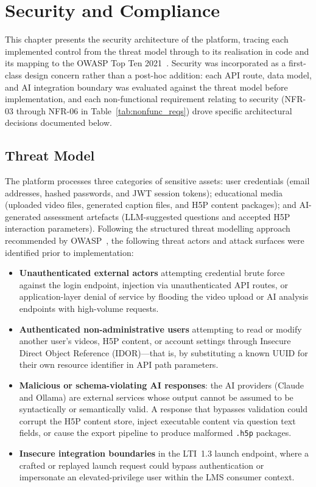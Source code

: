 \chapter{Security and Compliance}

This chapter presents the security architecture of the platform, tracing each
implemented control from the threat model through to its realisation in code
and its mapping to the OWASP Top Ten 2021~\cite{owasp2021}. Security was
incorporated as a first-class design concern rather than a post-hoc addition:
each API route, data model, and AI integration boundary was evaluated against
the threat model before implementation, and each non-functional requirement
relating to security (NFR-03 through NFR-06 in Table~\ref{tab:nonfunc_reqs})
drove specific architectural decisions documented below.

\section{Threat Model}
\label{sec:threat_model}

The platform processes three categories of sensitive assets: user credentials
(email addresses, hashed passwords, and JWT session tokens); educational
media (uploaded video files, generated caption files, and H5P content
packages); and AI-generated assessment artefacts (LLM-suggested questions
and accepted H5P interaction parameters). Following the structured threat
modelling approach recommended by OWASP~\cite{owasp2021}, the following
threat actors and attack surfaces were identified prior to implementation:

\begin{itemize}
  \item \textbf{Unauthenticated external actors} attempting credential brute
  force against the login endpoint, injection via unauthenticated API routes,
  or application-layer denial of service by flooding the video upload or AI
  analysis endpoints with high-volume requests.

  \item \textbf{Authenticated non-administrative users} attempting to read or
  modify another user's videos, H5P content, or account settings through
  Insecure Direct Object Reference (IDOR)---that is, by substituting a known
  UUID for their own resource identifier in API path parameters.

  \item \textbf{Malicious or schema-violating AI responses}: the AI providers
  (Claude and Ollama) are external services whose output cannot be assumed to
  be syntactically or semantically valid. A response that bypasses validation
  could corrupt the H5P content store, inject executable content via
  question text fields, or cause the export pipeline to produce malformed
  \texttt{.h5p} packages.

  \item \textbf{Insecure integration boundaries} in the LTI~1.3 launch
  endpoint, where a crafted or replayed launch request could bypass
  authentication or impersonate an elevated-privilege user within the LMS
  consumer context.
\end{itemize}

